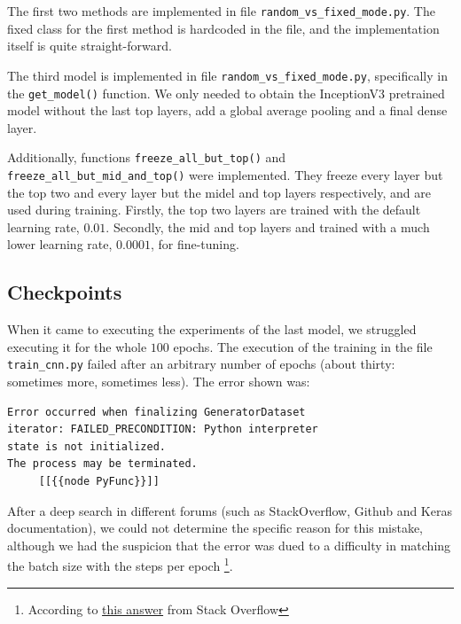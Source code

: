 \documentclass[letterpaper, 10 pt, conference]{ieeeconf}
\begin{document}
The first two methods are implemented in file \texttt{random_vs_fixed_mode.py}. The fixed class for the first method is hardcoded in the file, and the implementation itself is quite straight-forward.

The third model is implemented in file \texttt{random_vs_fixed_mode.py}, specifically in the \texttt{get_model()} function. We only needed to obtain the InceptionV3 pretrained model without the last top layers, add a global average pooling and a final dense layer.

Additionally, functions \texttt{freeze_all_but_top()} and \texttt{freeze_all_but_mid_and_top()} were implemented. They freeze every layer but the top two and every layer but the midel and top layers respectively, and are used during training. Firstly, the top two layers are trained with the default learning rate, $0.01$. Secondly, the mid and top layers and trained with a much lower learning rate, $0.0001$, for fine-tuning.

\subsection{Checkpoints}

When it came to executing the experiments of the last model, we struggled executing it for the whole \(100\) epochs. The execution of the training in the file \texttt{train_cnn.py} failed after an arbitrary number of epochs (about thirty: sometimes more, sometimes less). The error shown was:

\begin{verbatim}
Error occurred when finalizing GeneratorDataset
iterator: FAILED_PRECONDITION: Python interpreter
state is not initialized.
The process may be terminated.
	 [[{{node PyFunc}}]]
\end{verbatim}

After a deep search in different forums (such as StackOverflow, Github and Keras documentation), we could not determine the specific reason for this mistake, although we had the suspicion that the error was dued to a difficulty in matching the batch size with the steps per epoch \footnote{According to \href{https://stackoverflow.com/questions/60000573/error-occurred-when-finalizing-generatordataset-iterator-cancelled-operation-w}{this answer} from Stack Overflow  }.\\
\end{document}
